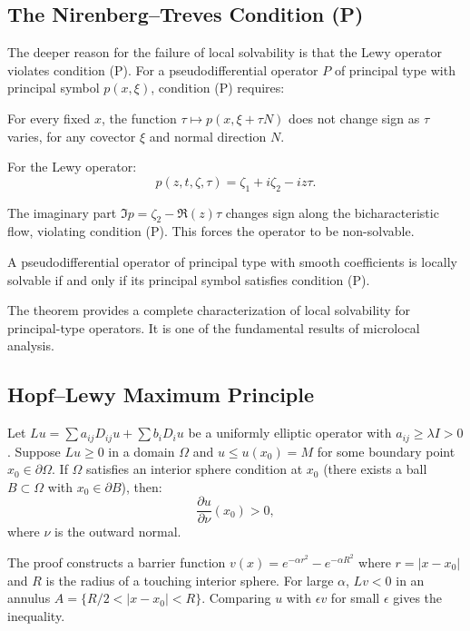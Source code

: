 \subsection{The Nirenberg--Treves Condition (P)}

The deeper reason for the failure of local solvability is that the Lewy operator violates condition (P). For a pseudodifferential operator $P$ of principal type with principal symbol $p(x, \xi)$, condition (P) requires:

For every fixed $x$, the function $\tau \mapsto p(x, \xi + \tau N)$ does not change sign as $\tau$ varies, for any covector $\xi$ and normal direction $N$.

For the Lewy operator:
\[
p(z, t, \zeta, \tau) = \zeta_1 + i\zeta_2 - i z \tau.
\]

The imaginary part $\Im p = \zeta_2 - \Re(z) \tau$ changes sign along the bicharacteristic flow, violating condition (P). This forces the operator to be non-solvable.

\begin{theorem}
A pseudodifferential operator of principal type with smooth coefficients is locally solvable if and only if its principal symbol satisfies condition (P).
\end{theorem}

The theorem provides a complete characterization of local solvability for principal-type operators. It is one of the fundamental results of microlocal analysis.

\subsection{Hopf--Lewy Maximum Principle}

\begin{theorem}
Let $Lu = \sum a_{ij} D_{ij} u + \sum b_i D_i u$ be a uniformly elliptic operator with $a_{ij} \geq \lambda I > 0$. Suppose $Lu \geq 0$ in a domain $\Omega$ and $u \leq u(x_0) = M$ for some boundary point $x_0 \in \partial \Omega$. If $\Omega$ satisfies an interior sphere condition at $x_0$ (there exists a ball $B \subset \Omega$ with $x_0 \in \partial B$), then:
\[
\frac{\partial u}{\partial \nu}(x_0) > 0,
\]
where $\nu$ is the outward normal.
\end{theorem}

The proof constructs a barrier function $v(x) = e^{-\alpha r^2} - e^{-\alpha R^2}$ where $r = |x - x_0|$ and $R$ is the radius of a touching interior sphere. For large $\alpha$, $Lv < 0$ in an annulus $A = \{R/2 < |x - x_0| < R\}$. Comparing $u$ with $\epsilon v$ for small $\epsilon$ gives the inequality.

